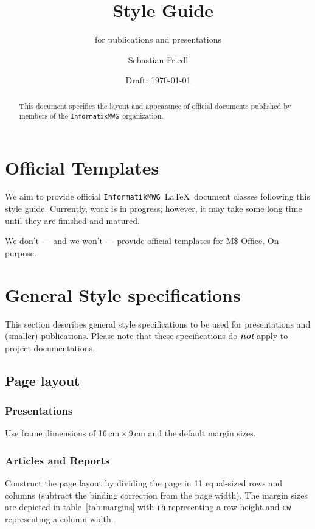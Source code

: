 \documentclass[10pt,DIV=11,abstracton]{scrartcl}
\title{\informatikMWG\ Style Guide}
\subtitle{for publications and presentations}
\author{Sebastian Friedl}
\date{Draft: \today}
\def\informatikMWG{\texttt{InformatikMWG}}
\begin{document}
    \maketitle

    \begin{abstract}\noindent
        This document specifies the layout and appearance of official documents published by members of the \informatikMWG\ organization.
    \end{abstract}
    
    \bigskip\bigskip\bigskip
    
    \section{Official Templates}
    We aim to provide official \informatikMWG\ \LaTeX\ document classes following this style guide. Currently, work is in progress; however, it may take some long time until they are finished and matured.

    \medskip
    We don't --- and we won't --- provide official templates for M\$ Office. On purpose.

    
    \section{General Style specifications}
    This section describes general style specifications to be used for presentations and (smaller) publications.
    Please note that these specifications do \emph{\textbf{not}} apply to project documentations.
    
    \subsection{Page layout}
    \subsubsection*{Presentations}
    Use frame dimensions of 16\,cm\,$\times$\,9\,cm and the default margin sizes.
    
    \subsubsection*{Articles and Reports}
    Construct the page layout by dividing the page in 11 equal-sized rows and columns (subtract the binding correction from the page width). The margin sizes are depicted in table~\ref{tab:margins} with \texttt{rh} representing a row height and \texttt{cw} representing a column width.
    
\end{document}
